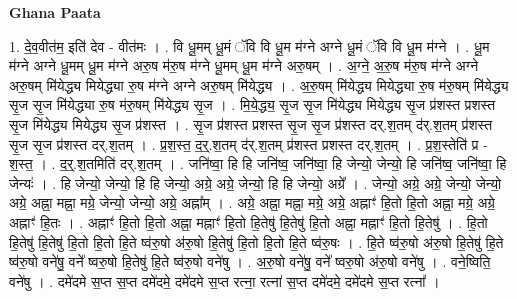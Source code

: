 \documentclass[17pt]{extarticle}
\begin{document}
\textbf{Ghana Paata } \newline

1. दे॒व॒वीत॑म॒ इति॑ देव - वीत॑मः । . वि धू॒मम् धू॒मं ॅवि वि धू॒म म॑ग्ने अग्ने धू॒मं ॅवि वि धू॒म म॑ग्ने । . धू॒म म॑ग्ने अग्ने धू॒मम् धू॒म म॑ग्ने अरु॒ष म॑रु॒ष म॑ग्ने धू॒मम् धू॒म म॑ग्ने अरु॒षम् । . अ॒ग्ने॒ अ॒रु॒ष म॑रु॒ष म॑ग्ने अग्ने अरु॒षम् मि॑येद्ध्य मियेद्ध्या रु॒ष म॑ग्ने अग्ने अरु॒षम् मि॑येद्ध्य । . अ॒रु॒षम् मि॑येद्ध्य मियेद्ध्या रु॒ष म॑रु॒षम् मि॑येद्ध्य सृ॒ज सृ॒ज मि॑येद्ध्या रु॒ष म॑रु॒षम् मि॑येद्ध्य सृ॒ज । . मि॒ये॒द्ध्य॒ सृ॒ज सृ॒ज मि॑येद्ध्य मियेद्ध्य सृ॒ज प्र॑शस्त प्रशस्त सृ॒ज मि॑येद्ध्य मियेद्ध्य सृ॒ज प्र॑शस्त । . सृ॒ज प्र॑शस्त प्रशस्त सृ॒ज सृ॒ज प्र॑शस्त दर्.श॒तम् द॑र्.श॒तम् प्र॑शस्त सृ॒ज सृ॒ज प्र॑शस्त दर्.श॒तम् । . प्र॒श॒स्त॒ द॒र्॒.श॒तम् द॑र्.श॒तम् प्र॑शस्त प्रशस्त दर्.श॒तम् । . प्र॒श॒स्तेति॑ प्र - श॒स्त॒ । . द॒र्॒.श॒तमिति॑ दर्.श॒तम् । . जनि॑ष्वा॒ हि हि जनि॑ष्व॒ जनि॑ष्वा॒ हि जेन्यो॒ जेन्यो॒ हि जनि॑ष्व॒ जनि॑ष्वा॒ हि जेन्यः॑ । . हि जेन्यो॒ जेन्यो॒ हि हि जेन्यो॒ अग्रे॒ अग्रे॒ जेन्यो॒ हि हि जेन्यो॒ अग्रे᳚ । . जेन्यो॒ अग्रे॒ अग्रे॒ जेन्यो॒ जेन्यो॒ अग्रे॒ अह्ना॒ मह्ना॒ मग्रे॒ जेन्यो॒ जेन्यो॒ अग्रे॒ अह्ना᳚म् । . अग्रे॒ अह्ना॒ मह्ना॒ मग्रे॒ अग्रे॒ अह्नाꣳ॑ हि॒तो हि॒तो अह्ना॒ मग्रे॒ अग्रे॒ अह्नाꣳ॑ हि॒तः । . अह्नाꣳ॑ हि॒तो हि॒तो अह्ना॒ मह्नाꣳ॑ हि॒तो हि॒तेषु॑ हि॒तेषु॑ हि॒तो अह्ना॒ मह्नाꣳ॑ हि॒तो हि॒तेषु॑ । . हि॒तो हि॒तेषु॑ हि॒तेषु॑ हि॒तो हि॒तो हि॒ते ष्व॑रु॒षो अ॑रु॒षो हि॒तेषु॑ हि॒तो हि॒तो हि॒ते ष्व॑रु॒षः । . हि॒ते ष्व॑रु॒षो अ॑रु॒षो हि॒तेषु॑ हि॒ते ष्व॑रु॒षो वने॑षु॒ वने᳚ ष्वरु॒षो हि॒तेषु॑ हि॒ते ष्व॑रु॒षो वने॑षु । . अ॒रु॒षो वने॑षु॒ वने᳚ ष्वरु॒षो अ॑रु॒षो वने॑षु । . वने॒ष्विति॒ वने॑षु । . दमे॑दमे स॒प्त स॒प्त दमे॑दमे॒ दमे॑दमे स॒प्त रत्ना॒ रत्ना॑ स॒प्त दमे॑दमे॒ दमे॑दमे स॒प्त रत्ना᳚ । \newline
\end{document}

